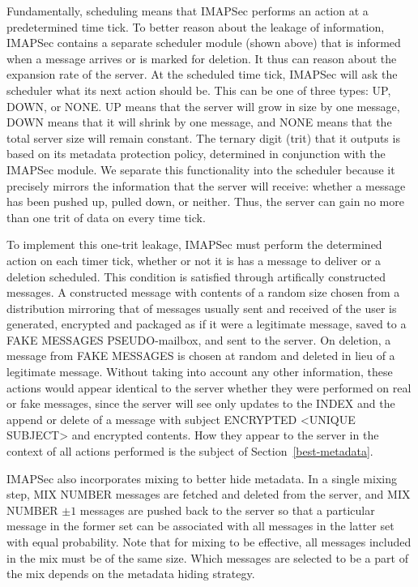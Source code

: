 \documentclass[pageno]{jpaper}
\newcommand{\project}{IMAPSec }
\begin{document}
Fundamentally, scheduling means that \project performs an action at a predetermined time tick. To better reason about the leakage of information, \project contains a separate scheduler module (shown above) that is informed when a message arrives or is marked for deletion. It thus can reason about the expansion rate of the server. At the scheduled time tick, \project will ask the scheduler what its next action should be. This can be one of three types: UP, DOWN, or NONE. UP means that the server will grow in size by one message, DOWN means that it will shrink by one message, and NONE means that the total server size will remain constant. The ternary digit (trit) that it outputs is based on its metadata protection policy, determined in conjunction with the \project module. We separate this functionality into the scheduler because it precisely mirrors the information that the server will receive: whether a message has been pushed up, pulled down, or neither. Thus, the server can gain no more than one trit of data on every time tick.

To implement this one-trit leakage, \project must perform the determined action on each timer tick, whether or not it is has a message to deliver or a deletion scheduled. This condition is satisfied through artifically constructed messages. A constructed message with contents of a random size chosen from a distribution mirroring that of messages usually sent and received of the user is generated, encrypted and packaged as if it were a legitimate message, saved to a FAKE MESSAGES PSEUDO-mailbox, and sent to the server. On deletion, a message from FAKE MESSAGES is chosen at random and deleted in lieu of a legitimate message. Without taking into account any other information, these actions would appear identical to the server whether they were performed on real or fake messages, since the server will see only updates to the INDEX and the append or delete of a message with subject ENCRYPTED <UNIQUE SUBJECT> and encrypted contents. How they appear to the server in the context of all actions performed is the subject of Section~\ref{best-metadata}.

\project also incorporates mixing to better hide metadata. In a single mixing step, MIX NUMBER messages are fetched and deleted from the server, and MIX NUMBER $\pm 1$ messages are pushed back to the server so that a particular message in the former set can be associated with all messages in the latter set with equal probability. Note that for mixing to be effective, all messages included in the mix must be of the same size. Which messages are selected to be a part of the mix depends on the metadata hiding strategy.
\end{document}

